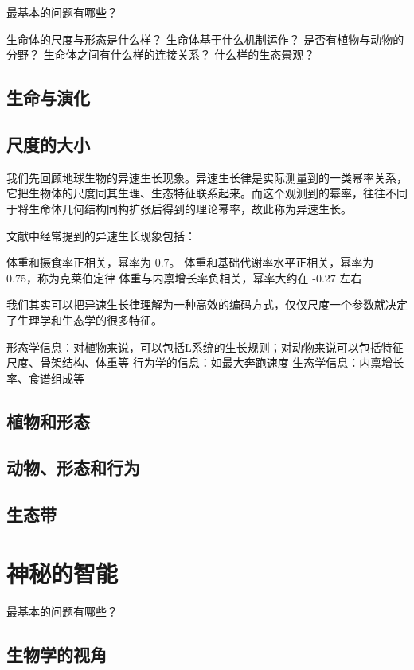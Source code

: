 \documentclass[a4paper,10.5pt]{book}
\begin{document}
最基本的问题有哪些？

生命体的尺度与形态是什么样？
生命体基于什么机制运作？
是否有植物与动物的分野？
生命体之间有什么样的连接关系？
什么样的生态景观？

\section{生命与演化}

\section{尺度的大小}

我们先回顾地球生物的异速生长现象。异速生长律是实际测量到的一类幂率关系，
它把生物体的尺度同其生理、生态特征联系起来。而这个观测到的幂率，往往不同于将生命体几何结构同构扩张后得到的理论幂率，故此称为异速生长。

文献中经常提到的异速生长现象包括：

体重和摄食率正相关，幂率为 0.7。
体重和基础代谢率水平正相关，幂率为 0.75，称为克莱伯定律
体重与内禀增长率负相关，幂率大约在 -0.27 左右

我们其实可以把异速生长律理解为一种高效的编码方式，仅仅尺度一个参数就决定了生理学和生态学的很多特征。

形态学信息：对植物来说，可以包括L系统的生长规则；对动物来说可以包括特征尺度、骨架结构、体重等
行为学的信息：如最大奔跑速度
生态学信息：内禀增长率、食谱组成等

\section{植物和形态}

\section{动物、形态和行为}

\section{生态带}



\chapter{神秘的智能}

最基本的问题有哪些？

\section{生物学的视角}
\end{document}
